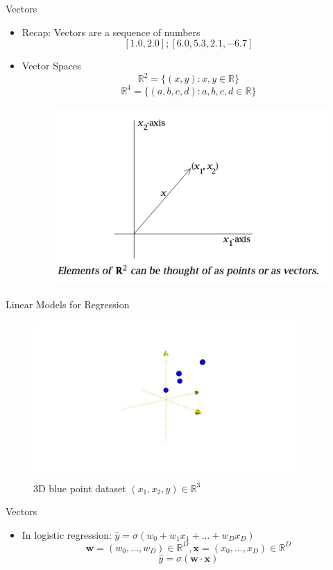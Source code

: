 \begin{frame}{Vectors}
\begin{itemize}
    \item Recap: Vectors are a sequence of numbers
    $$[1.0, 2.0]; [6.0, 5.3, 2.1, -6.7]$$
    \item Vector Spaces
    $$\mathbb{R}^2 = \{(x, y) : x, y \in \mathbb{R}\}$$
    $$\mathbb{R}^4 = \{(a, b, c, d) : a, b, c, d \in \mathbb{R}\}$$
    \begin{figure}
    \centering
    \includegraphics[width=.5\textwidth]{img/vectors.png}
    \end{figure}
\end{itemize}
\end{frame}

\begin{frame}{Linear Models for Regression}
\begin{figure}
    \centering
    \includegraphics[width=0.9\textwidth]{img/3d_regressed_points.jpg}
    \caption{3D blue point dataset $(x_1, x_2, y) \in \mathbb{R}^3$}
\end{figure}
\end{frame}

\begin{frame}{Vectors}
\begin{itemize}
    \item In logistic regression: $\hat{y} = \sigma(w_0 + w_1x_1 + ... + w_Dx_D)$
    $$\textbf{w} = (w_0, ..., w_D) \in \mathbb{R}^D, \textbf{x} = (x_0, ..., x_D) \in \mathbb{R}^D$$
    $$\hat{y} = \sigma(\textbf{w} \cdot \textbf{x})$$
\end{itemize}
\end{frame}

